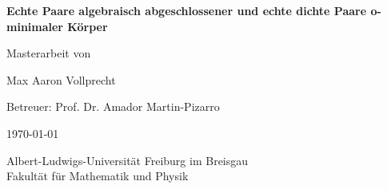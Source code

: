 \documentclass[a4paper, 11pt]{report}
\theoremstyle{definition}
\begin{document}
	\begin{titlepage}

		\centering

		$ $\par

		\vspace{4.5cm}

		\Huge{\textbf{Echte Paare algebraisch abgeschlossener und echte dichte Paare o-minimaler Körper}\par}

		\vspace{3cm}

		\large{Masterarbeit von \par}

		\vspace{0.4cm}

		\Large{Max Aaron Vollprecht\par}

		\vspace{0.6cm}

		\large{Betreuer: Prof. Dr. Amador Martin-Pizarro\par}

		\vfill

		\large{\today\par}

		\vspace{0.6cm}

		Albert-Ludwigs-Universität Freiburg im Breisgau\\

		Fakultät für Mathematik und Physik

	\end{titlepage}
    \newpage
    \thispagestyle{empty}
    \mbox{}
    \setcounter{page}{0}
	
	
	\tableofcontents
	\newpage
	\thispagestyle{empty}
	\mbox{}
	\newpage
	\setcounter{page}{1}
	
	
	\newpage
	\thispagestyle{empty}
	\mbox{}
    
    \newpage
    \thispagestyle{empty}
    \mbox{}
    \newpage
    \appendix
    \setcounter{page}{1}
    
    \newpage
    {}
    
\end{document}
